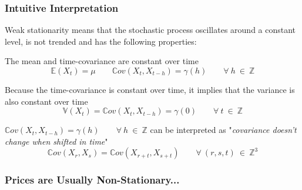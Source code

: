 \documentclass{beamer}
\newenvironment{wideenumerate}{\enumerate\addtolength{\itemsep}{10pt}}{\endenumerate}
\begin{document}
\begin{frame}
  \frametitle{Intuitive Interpretation}
   Weak stationarity means that the stochastic process oscillates around a constant level, is not trended and has the following properties:\\
  
  \begin{wideenumerate}
  \item The mean and time-covariance are constant over time
    \begin{equation*}
\mathbb{E}(X_t) = \mu \qquad \mathbb{C}ov(X_t, X_{t-h}) = \gamma(h) \qquad \forall \ h \ \in \ \mathbb{Z}
\end{equation*}
\item Because the time-covariance is constant over time, it implies that the variance is also constant over time
  \begin{equation*}
\mathbb{V}(X_t) = \mathbb{C}ov(X_t, X_{t-h}) = \gamma(0) \qquad \forall \ t \ \in \ \mathbb{Z}
  \end{equation*}
\item $\mathbb{C}ov(X_t, X_{t-h}) = \gamma(h) \qquad \forall \ h \ \in \ \mathbb{Z}$ can be interpreted as "\emph{covariance doesn't change when shifted in time}"
  \begin{equation*}
\mathbb{C}ov(X_r, X_s) = \mathbb{C}ov(X_{r+t}, X_{s+t}) \qquad \forall \ (r, s, t) \ \in \ \mathbb{Z}^3
  \end{equation*}
  
  \end{wideenumerate}
\end{frame}


\begin{frame}
\frametitle{Prices are Usually Non-Stationary...}
\end{frame}
\end{document}
